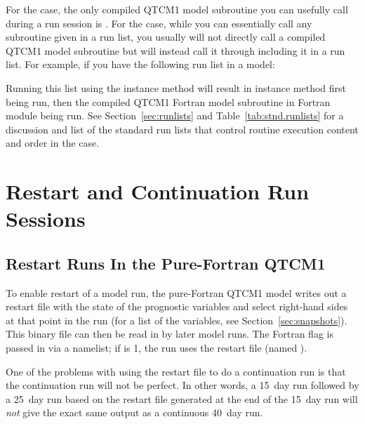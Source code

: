 For the  case, the only compiled QTCM1 model
subroutine you can usefully call during a run session is .
For the  case, while you can essentially call any subroutine
given in a run list, you usually will not directly call a compiled QTCM1
model subroutine but will instead call it through including it in a
run list.  For example, if you have the following run list in a
 model:
\begin{codeblock}
\end{codeblock}
Running this list using the  instance method
 will result in  instance method
 first being run, 
then the compiled QTCM1 Fortran model subroutine
 in Fortran module  being run.
See Section~\ref{sec:runlists} and
Table~\ref{tab:stnd.runlists} for a discussion and list of the
standard run lists that control routine execution content and order
in the  case.




\section{Restart and Continuation Run Sessions}
				\label{sec:contination.run.sessions}


	\subsection{Restart Runs In the Pure-Fortran QTCM1}
					\label{sec:puref90.restart}

To enable restart of a model run, the pure-Fortran QTCM1 model
writes out a restart file with the state of the prognostic variables
and select right-hand sides at that point in the run (for a list
of the variables, see Section~\ref{sec:snapshots}).  This binary
file can then be read in by later model runs.  The Fortran
 flag is passed in via a namelist; if 
is 1, the run uses the restart file (named ).

One of the problems with using the restart file to do a continuation
run is that the continuation run will not be perfect.  In other words,
a 15~day run followed by a 25~day run based on the restart file 
generated at the end of the 15~day run will \emph{not} give the
exact same output as a continuous 40~day run.


